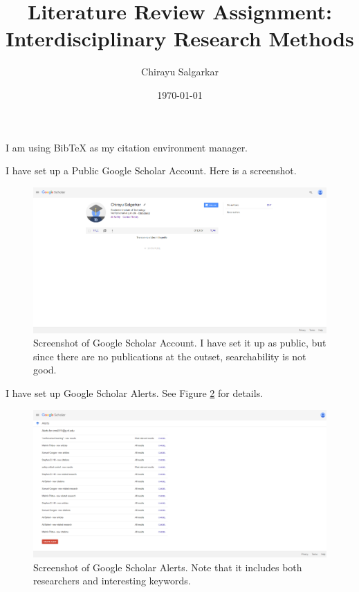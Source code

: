 \documentclass[10pt, oneside]{article}
\title{Literature Review Assignment: Interdisciplinary Research Methods}
\author{Chirayu Salgarkar}
\date{\today}
\newenvironment{problem}[2][Problem]{\begin{trivlist}
    \item[\hskip \labelsep {\bfseries #1}\hskip \labelsep {\bfseries #2.}]}{\end{trivlist}}
\begin{document}
\maketitle

\begin{problem}{$\#1$} 
I am using BibTeX as my citation environment manager. 
\end{problem}

\begin{problem}{$\#2$}
I have set up a Public Google Scholar Account. Here is a screenshot. 
\begin{figure}[H]
    \centering
    \includegraphics[width = \textwidth]{2024-09-19 18.42.25 scholar.google.com ce7081f53fb7.png}
    \caption{Screenshot of Google Scholar Account. I have set it up as public, but since there are no publications at the outset, searchability is not good.}
    \label{fig:account}
    \end{figure}
\end{problem}


\begin{problem}{$\#2$}
    I have set up Google Scholar Alerts. See Figure \ref{fig:alerts} for details.
        \begin{figure}[H]
        \centering
        \includegraphics[width = \textwidth]{2024-09-19 18.20.07 scholar.google.com f39d6d4bc328.png}
        \caption{Screenshot of Google Scholar Alerts. Note that it includes both researchers and interesting keywords.}
        \label{fig:alerts}
        \end{figure}
    \end{problem}
\end{document}
